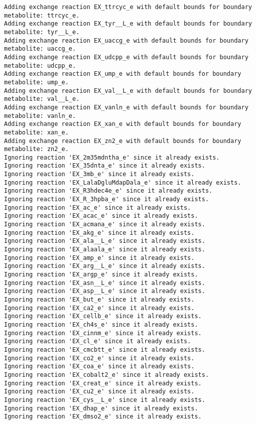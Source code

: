 \documentclass[
  letterpaper,
  DIV=11,
  numbers=noendperiod]{scrartcl}
\begin{document}
\begin{verbatim}
Adding exchange reaction EX_ttrcyc_e with default bounds for boundary metabolite: ttrcyc_e.
Adding exchange reaction EX_tyr__L_e with default bounds for boundary metabolite: tyr__L_e.
Adding exchange reaction EX_uaccg_e with default bounds for boundary metabolite: uaccg_e.
Adding exchange reaction EX_udcpp_e with default bounds for boundary metabolite: udcpp_e.
Adding exchange reaction EX_ump_e with default bounds for boundary metabolite: ump_e.
Adding exchange reaction EX_val__L_e with default bounds for boundary metabolite: val__L_e.
Adding exchange reaction EX_vanln_e with default bounds for boundary metabolite: vanln_e.
Adding exchange reaction EX_xan_e with default bounds for boundary metabolite: xan_e.
Adding exchange reaction EX_zn2_e with default bounds for boundary metabolite: zn2_e.
Ignoring reaction 'EX_2m35mdntha_e' since it already exists.
Ignoring reaction 'EX_35dnta_e' since it already exists.
Ignoring reaction 'EX_3mb_e' since it already exists.
Ignoring reaction 'EX_LalaDgluMdapDala_e' since it already exists.
Ignoring reaction 'EX_R3hdec4e_e' since it already exists.
Ignoring reaction 'EX_R_3hpba_e' since it already exists.
Ignoring reaction 'EX_ac_e' since it already exists.
Ignoring reaction 'EX_acac_e' since it already exists.
Ignoring reaction 'EX_acmana_e' since it already exists.
Ignoring reaction 'EX_akg_e' since it already exists.
Ignoring reaction 'EX_ala__L_e' since it already exists.
Ignoring reaction 'EX_alaala_e' since it already exists.
Ignoring reaction 'EX_amp_e' since it already exists.
Ignoring reaction 'EX_arg__L_e' since it already exists.
Ignoring reaction 'EX_argp_e' since it already exists.
Ignoring reaction 'EX_asn__L_e' since it already exists.
Ignoring reaction 'EX_asp__L_e' since it already exists.
Ignoring reaction 'EX_but_e' since it already exists.
Ignoring reaction 'EX_ca2_e' since it already exists.
Ignoring reaction 'EX_cellb_e' since it already exists.
Ignoring reaction 'EX_ch4s_e' since it already exists.
Ignoring reaction 'EX_cinnm_e' since it already exists.
Ignoring reaction 'EX_cl_e' since it already exists.
Ignoring reaction 'EX_cmcbtt_e' since it already exists.
Ignoring reaction 'EX_co2_e' since it already exists.
Ignoring reaction 'EX_coa_e' since it already exists.
Ignoring reaction 'EX_cobalt2_e' since it already exists.
Ignoring reaction 'EX_creat_e' since it already exists.
Ignoring reaction 'EX_cu2_e' since it already exists.
Ignoring reaction 'EX_cys__L_e' since it already exists.
Ignoring reaction 'EX_dhap_e' since it already exists.
Ignoring reaction 'EX_dmso2_e' since it already exists.

\end{verbatim}
\end{document}
